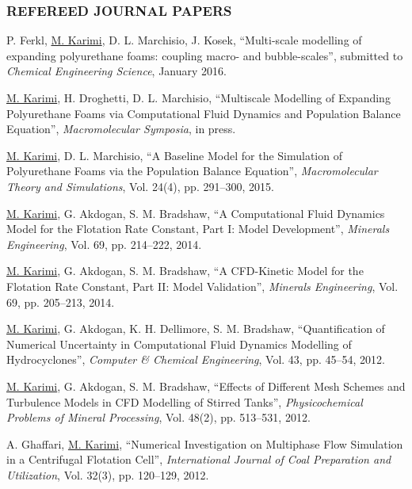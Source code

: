 \documentclass[10pt,a4]{article}
\newcounter{myEnumCounter}
\newcounter{mySaveCounter}
\renewenvironment{enumerate}{%
  \begin{list}{\arabic{myEnumCounter}.}{\usecounter{myEnumCounter}%
  \setcounter{myEnumCounter}{\value{mySaveCounter}}}
  }{%
  \setcounter{mySaveCounter}{\value{myEnumCounter}}\end{list}%
}
\newcommand{\quotes}[1]{``#1''}
\begin{document}
\begin{small}
\subsubsection*{REFEREED JOURNAL PAPERS}

\begin{enumerate}
	\item
P. Ferkl, \underline{M. Karimi}, D. L. Marchisio, J. Kosek, \quotes{Multi-scale modelling of expanding polyurethane foams: coupling macro- and bubble-scales}, submitted to \textit{Chemical Engineering Science}, January 2016.
	
    \item
\underline{M. Karimi}, H. Droghetti, D. L. Marchisio, \quotes{Multiscale Modelling of Expanding Polyurethane Foams via Computational Fluid Dynamics and Population Balance Equation},  \textit{Macromolecular Symposia}, in press.

	\item
\underline{M. Karimi}, D. L. Marchisio, \quotes{A Baseline Model for the Simulation of Polyurethane Foams via the Population Balance Equation}, \textit{Macromolecular Theory and Simulations}, Vol. 24(4), pp. 291--300, 2015.
	
	\item
\underline{M. Karimi}, G. Akdogan, S. M. Bradshaw, \quotes{A Computational Fluid Dynamics Model for the Flotation Rate Constant, Part I: Model Development}, \textit{Minerals Engineering}, Vol. 69, pp. 214--222, 2014.

	\item
\underline{M. Karimi}, G. Akdogan, S. M. Bradshaw, \quotes{A CFD-Kinetic Model for the Flotation Rate Constant, Part II: Model Validation}, \textit{Minerals Engineering}, Vol. 69, pp. 205--213, 2014.
	
	\item
\underline{M. Karimi}, G. Akdogan, K. H. Dellimore, S. M. Bradshaw, \quotes{Quantification of Numerical Uncertainty in Computational Fluid Dynamics Modelling of Hydrocyclones}, \textit{Computer \& Chemical Engineering}, Vol. 43, pp. 45--54, 2012. 

	\item 
\underline{M. Karimi}, G. Akdogan, S. M. Bradshaw, \quotes{Effects of Different Mesh Schemes and Turbulence Models in CFD Modelling of Stirred Tanks}, \textit{Physicochemical Problems of Mineral Processing}, Vol. 48(2), pp. 513--531, 2012.

	\item
A. Ghaffari, \underline{M. Karimi}, \quotes{Numerical Investigation on Multiphase Flow Simulation in a Centrifugal Flotation Cell}, \textit{International Journal of Coal Preparation and Utilization}, Vol. 32(3), pp. 120--129, 2012.


\end{enumerate}
\end{small}
\end{document}
